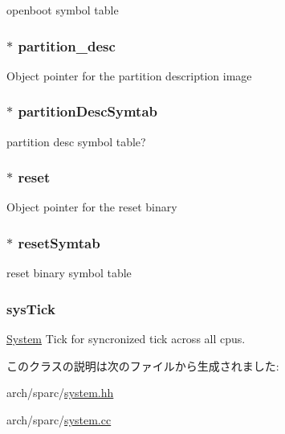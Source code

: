 \label{classSparcSystem_ac6366336078abefc0f3d2b6bd5846f6b}
openboot symbol table \hypertarget{classSparcSystem_a4c30c01c5354157df3672b2891888c7a}{
\subsubsection[{partition\_\-desc}]{$\ast$ {\bf partition\_\-desc}}}
\label{classSparcSystem_a4c30c01c5354157df3672b2891888c7a}
Object pointer for the partition description image \hypertarget{classSparcSystem_aa85085e0cb624ffd89646d7101d9d9ec}{
\subsubsection[{partitionDescSymtab}]{$\ast$ {\bf partitionDescSymtab}}}
\label{classSparcSystem_aa85085e0cb624ffd89646d7101d9d9ec}
partition desc symbol table? \hypertarget{classSparcSystem_abd507156b4f29b64ca6c1327e3c9aff1}{
\subsubsection[{reset}]{$\ast$ {\bf reset}}}
\label{classSparcSystem_abd507156b4f29b64ca6c1327e3c9aff1}
Object pointer for the reset binary \hypertarget{classSparcSystem_a5f99984fee3a68889273d3f97481cb82}{
\subsubsection[{resetSymtab}]{$\ast$ {\bf resetSymtab}}}
\label{classSparcSystem_a5f99984fee3a68889273d3f97481cb82}
reset binary symbol table \hypertarget{classSparcSystem_a91f1052694138b23ec475743589bfb9b}{
\subsubsection[{sysTick}]{ {\bf sysTick}}}
\label{classSparcSystem_a91f1052694138b23ec475743589bfb9b}
\hyperlink{classSystem}{System} Tick for syncronized tick across all cpus. 

このクラスの説明は次のファイルから生成されました:\begin{DoxyCompactItemize}
\item 
arch/sparc/\hyperlink{arch_2sparc_2system_8hh}{system.hh}\item 
arch/sparc/\hyperlink{arch_2sparc_2system_8cc}{system.cc}\end{DoxyCompactItemize}
